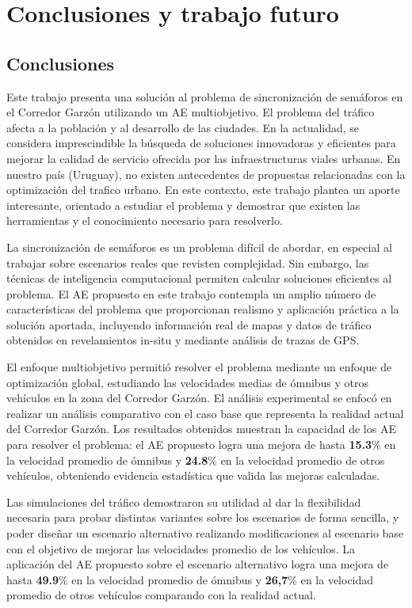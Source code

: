 \chapter{Conclusiones y trabajo futuro}

\section{Conclusiones}
Este trabajo presenta una solución al problema de sincronización de semáforos en el Corredor Garzón utilizando un AE multiobjetivo. El problema del tráfico afecta a la población y al desarrollo de las ciudades. En la actualidad, se considera imprescindible la búsqueda de soluciones innovadoras y eficientes para mejorar la calidad de servicio ofrecida por las infraestructuras viales urbanas. En nuestro país (Uruguay), no existen antecedentes de propuestas relacionadas con la optimización del trafico urbano. En este contexto, este trabajo plantea un aporte interesante, orientado a estudiar el problema y demostrar que existen las herramientas y el conocimiento necesario para resolverlo.

La sincronización de semáforos es un problema difícil de abordar, en especial al trabajar sobre escenarios reales que revisten complejidad. Sin embargo, las técnicas de inteligencia computacional permiten calcular soluciones eficientes al problema. 
El AE propuesto en este trabajo contempla un amplio número de características del problema que proporcionan realismo y aplicación práctica a la solución aportada, incluyendo información real de mapas y datos de tráfico obtenidos en revelamientos in-situ y mediante análisis de trazas de GPS.

El enfoque multiobjetivo permitió resolver el problema mediante un enfoque de optimización global, estudiando las velocidades medias de ómnibus y otros vehículos en la zona del Corredor Garzón. El análisis experimental se enfocó en realizar un análisis comparativo con el caso base que representa la realidad actual del Corredor Garzón. Los resultados obtenidos muestran la capacidad de los AE para resolver el problema: el AE propuesto logra una mejora de hasta \textbf{15.3}\% en la velocidad promedio de ómnibus y \textbf{24.8}\% en la velocidad promedio de otros vehículos, obteniendo evidencia estadística que valida las mejoras calculadas. 

Las simulaciones del tráfico demostraron su utilidad al dar la flexibilidad necesaria para probar distintas variantes sobre los escenarios de forma sencilla, y poder diseñar un escenario alternativo realizando modificaciones al escenario base con el objetivo de mejorar las velocidades promedio de los vehículos. La aplicación del AE propuesto sobre el escenario alternativo logra una mejora de hasta \textbf{49.9}\% en la velocidad promedio de ómnibus y \textbf{26,7}\% en la velocidad promedio de otros vehículos comparando con la realidad actual.

